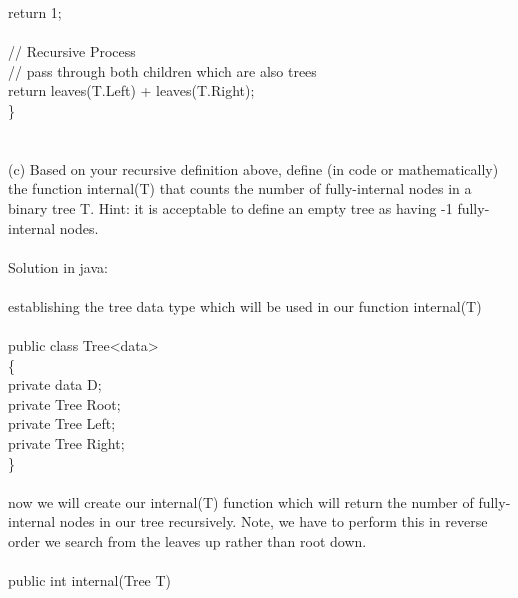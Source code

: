 \documentclass{article}
\newcommand*\moveToRight[1]{\hspace*{0em plus 1fill}\makebox{(#1)}}
\newcommand*\fixindent{ \hspace{1pt}\\}
\begin{document}
\hspace*{80pt} return 1;\\\\
\hspace*{65pt}// Recursive Process \\
\hspace*{65pt}// pass through both children which are also trees \\
\hspace*{65pt} return leaves(T.Left) + leaves(T.Right);\\
\hspace*{50pt}\}\\\\

\newpage
\fixindent{}
(c) Based on your recursive definition above, define (in code or mathematically) the function internal(T)
that counts the number of fully-internal nodes in a binary tree T. Hint: it is acceptable to define an empty
tree as having -1 fully-internal nodes. \moveToRight{4 marks}\\\\Solution in java:\\
\\establishing the tree data type which will be used in our function internal(T) \\\\
\hspace*{50pt}public class Tree\textless  data\textgreater\\
\hspace*{50pt}\{\\
\hspace*{65pt} private data D;\\
\hspace*{65pt} private Tree Root;\\
\hspace*{65pt} private Tree Left;\\
\hspace*{65pt} private Tree Right;\\
\hspace*{50pt}\}\\\\
now we will create our internal(T) function which will return
the number of fully-internal nodes in our tree recursively. Note, we have to perform this in reverse order we search from the leaves up rather than root down.\\\\
\hspace*{50pt}public int internal(Tree T)\\
\end{document}
